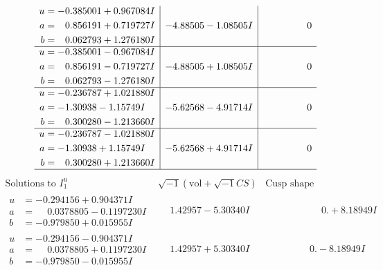 \documentclass[1p]{elsarticle_modified}
\theoremstyle{definition}
\newcommand{\I}{\sqrt{-1}}
\begin{document}
$$\begin{array}{c|c|c}
\begin{aligned}
u &= -0.385001 + 0.967084 I \\
a &= \phantom{-}0.856191 + 0.719727 I \\
b &= \phantom{-}0.062793 + 1.276180 I\end{aligned}
 & -4.88505 - 1.08505 I & \phantom{-0.000000 } 0 \\ \hline\begin{aligned}
u &= -0.385001 - 0.967084 I \\
a &= \phantom{-}0.856191 - 0.719727 I \\
b &= \phantom{-}0.062793 - 1.276180 I\end{aligned}
 & -4.88505 + 1.08505 I & \phantom{-0.000000 } 0 \\ \hline\begin{aligned}
u &= -0.236787 + 1.021880 I \\
a &= -1.30938 - 1.15749 I \\
b &= \phantom{-}0.300280 - 1.213660 I\end{aligned}
 & -5.62568 - 4.91714 I & \phantom{-0.000000 } 0 \\ \hline\begin{aligned}
u &= -0.236787 - 1.021880 I \\
a &= -1.30938 + 1.15749 I \\
b &= \phantom{-}0.300280 + 1.213660 I\end{aligned}
 & -5.62568 + 4.91714 I & \phantom{-0.000000 } 0\\
 \hline 
 \end{array}$$\newpage$$\begin{array}{c|c|c}  
\text{Solutions to }I^u_{1}& \I (\text{vol} + \sqrt{-1}CS) & \text{Cusp shape}\\
 \hline 
\begin{aligned}
u &= -0.294156 + 0.904371 I \\
a &= \phantom{-}0.0378805 - 0.1197230 I \\
b &= -0.979850 + 0.015955 I\end{aligned}
 & \phantom{-}1.42957 - 5.30340 I & \phantom{-0.000000 -}0. + 8.18949 I \\ \hline\begin{aligned}
u &= -0.294156 - 0.904371 I \\
a &= \phantom{-}0.0378805 + 0.1197230 I \\
b &= -0.979850 - 0.015955 I\end{aligned}
 & \phantom{-}1.42957 + 5.30340 I & \phantom{-0.000000 } 0. - 8.18949 I \\ \hline\begin{aligned}

\end{aligned}
\end{array}$$
\end{document}
